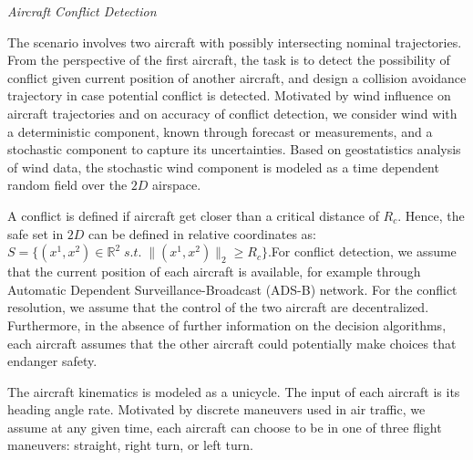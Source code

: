                  \emph{Aircraft Conflict Detection}

                 The scenario involves two aircraft with possibly
                 intersecting nominal trajectories. From the
                 perspective of the first aircraft, the task is to
                 detect the possibility of conflict given current
                 position of another aircraft, and design a collision
                 avoidance trajectory in case potential conflict is
                 detected. Motivated by wind influence on aircraft
                 trajectories and on accuracy of conflict detection,
                 we consider wind with a deterministic component,
                 known through forecast or measurements, and a
                 stochastic component to capture its
                 uncertainties. Based on geostatistics analysis of
                 wind data, the stochastic wind component is modeled
                 as a time dependent random field over the $2D$
                 airspace.

                 A conflict is defined if aircraft get closer than a
                 critical distance of $R_c$. Hence, the safe set in
                 $2D$ can be defined in relative coordinates as: $S =
                 \{ (x^1,x^2) \in \mathbb{R}^2 \; s. t. \; \|
                 (x^1,x^2) \|_2 \geq R_c \}$.For conflict detection,
                 we assume that the current position of each aircraft
                 is available, for example through Automatic Dependent
                 Surveillance-Broadcast (ADS-B) network. For the
                 conflict resolution, we assume that the control of
                 the two aircraft are decentralized. Furthermore, in
                 the absence of further information on the decision
                 algorithms, each aircraft assumes that the other
                 aircraft could potentially make choices that endanger
                 safety.


                 The aircraft kinematics is modeled as a unicycle. The
                 input of each aircraft is its heading angle
                 rate. Motivated by discrete maneuvers used in air
                 traffic, we assume at any given time, each aircraft
                 can choose to be in one of three flight maneuvers:
                 straight, right turn, or left turn.

